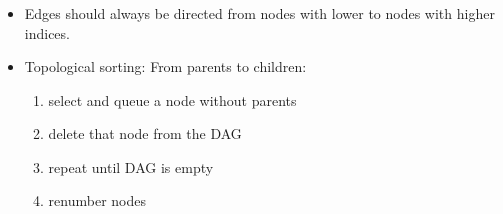 \begin{frame} \frametitle{\subsubsecname}


	\begin{itemize}
		
		\item Edges should always be directed from nodes with lower 
			to nodes with higher indices.
		\vspace{8mm}
		\item Topological sorting: From parents to children:
			\begin{enumerate}
				\item select and queue a node without parents
				\item delete that node from the DAG
				\item repeat until DAG is empty
				\item renumber nodes
			\end{enumerate}
	\end{itemize}
\end{frame}


